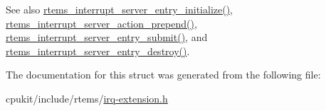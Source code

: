 \begin{DoxySeeAlso}{See also}
\mbox{\hyperlink{group__rtems__interrupt__extension_ga86ea2e100b06ad64fa320381bb34d2d1}{rtems\+\_\+interrupt\+\_\+server\+\_\+entry\+\_\+initialize()}}, \mbox{\hyperlink{group__rtems__interrupt__extension_ga734c36a08deae3d40775f46e526526be}{rtems\+\_\+interrupt\+\_\+server\+\_\+action\+\_\+prepend()}}, \mbox{\hyperlink{group__rtems__interrupt__extension_ga9fd697f72b1ab860a3ebb548fab5929f}{rtems\+\_\+interrupt\+\_\+server\+\_\+entry\+\_\+submit()}}, and \mbox{\hyperlink{group__rtems__interrupt__extension_ga8926167fe72ef23335bd242b0380c038}{rtems\+\_\+interrupt\+\_\+server\+\_\+entry\+\_\+destroy()}}. 
\end{DoxySeeAlso}


The documentation for this struct was generated from the following file\+:\begin{DoxyCompactItemize}
\item 
cpukit/include/rtems/\mbox{\hyperlink{irq-extension_8h}{irq-\/extension.\+h}}\end{DoxyCompactItemize}

